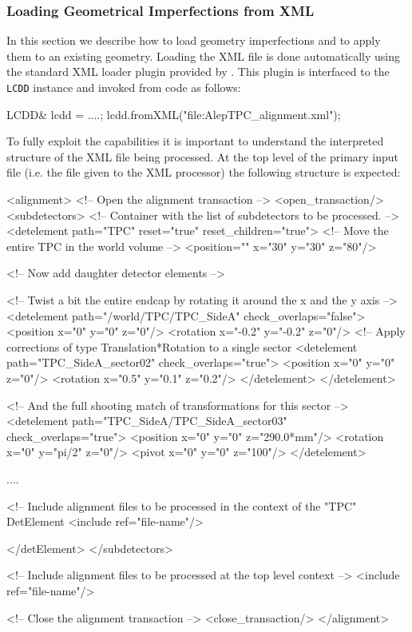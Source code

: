 \documentclass[10pt,a4paper]{article}
\begin{document}
\subsubsection{Loading Geometrical Imperfections from XML}
\label{sec:ddalign-user-manual-misalignment-manip-xml}
\noindent
In this section we describe how to load geometry imperfections and to apply them
to an existing geometry. Loading the XML file is done automatically using the 
standard XML loader plugin provided by \DDhep. This plugin is interfaced to 
the {\tt LCDD} instance and invoked from code as follows:
\begin{code}
    LCDD& lcdd = ....;
    lcdd.fromXML("file:AlepTPC_alignment.xml");
\end{code}
To fully exploit the capabilities it is important to understand the interpreted 
structure of the XML file being processed. At the top level of the primary 
input file (i.e. the file given to the XML processor) the following structure 
is expected:
\begin{code}
<alignment>
  <!-- Open the alignment transaction  -->
  <open_transaction/>
  <subdetectors>         <!-- Container with the list of subdetectors to be processed. -->
    <detelement path="TPC" reset="true" reset_children="true">
      <!-- Move the entire TPC in the world volume                                     -->
      <position="" x="30"   y="30"  z="80"/>

      <!-- Now add daughter detector elements                                          -->

      <!-- Twist a bit the entire endcap by rotating it around the x and the y axis    -->
      <detelement path="/world/TPC/TPC_SideA" check_overlaps="false">
        <position x="0"   y="0"  z="0"/>
        <rotation x="-0.2" y="-0.2"  z="0"/>
        <!-- Apply corrections of type Translation*Rotation to a single sector           
        <detelement path="TPC_SideA_sector02" check_overlaps="true">
          <position x="0"   y="0"   z="0"/>
          <rotation x="0.5" y="0.1" z="0.2"/>     
        </detelement>
      </detelement>

      <!-- And the full shooting match of transformations for this sector              -->
      <detelement path="TPC_SideA/TPC_SideA_sector03" check_overlaps="true">
        <position x="0" y="0"    z="290.0*mm"/>
        <rotation x="0" y="pi/2" z="0"/>     
        <pivot    x="0" y="0"    z="100"/>     
      </detelement>

      ....

      <!-- Include alignment files to be processed in the context of the "TPC" DetElement
      <include ref="file-name"/>

    </detElement>            
  </subdetectors>

  <!-- Include alignment files to be processed at the top level context               -->
  <include ref="file-name"/>

  <!-- Close the alignment transaction  -->
  <close_transaction/>
</alignment>
\end{code}
\end{document}
